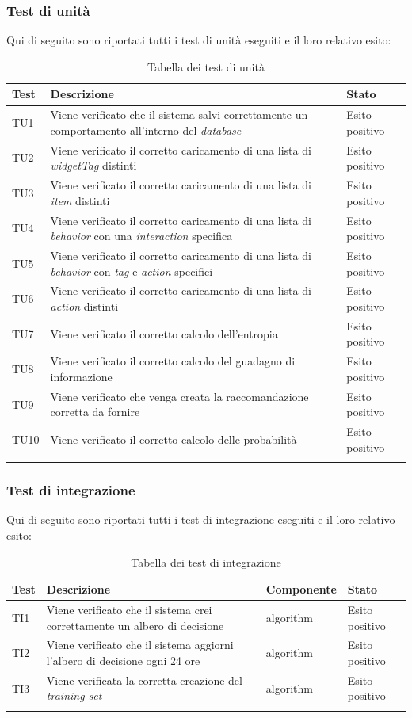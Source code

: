 \subsubsection{Test di unità}
Qui di seguito sono riportati tutti i test di unità eseguiti e il loro relativo esito:
\def\arraystretch{1.8}
\begin{longtable}{|l|p{7cm}|l|}
\hline
\textbf{Test} &	\textbf{Descrizione}	&	\textbf{Stato}	\\\hline
TU1	&	Viene verificato che il sistema salvi correttamente un comportamento all'interno del \emph{database}	&	Esito positivo	\\\hline
TU2	&	Viene verificato il corretto caricamento di una lista di \emph{widgetTag} distinti	&	Esito positivo	\\\hline
TU3	&	Viene verificato il corretto caricamento di una lista di \emph{item} distinti	&	Esito positivo	\\\hline
TU4	&	Viene verificato il corretto caricamento di una lista di \emph{behavior} con una \emph{interaction} specifica	&	Esito positivo	\\\hline
TU5	&	Viene verificato il corretto caricamento di una lista di \emph{behavior} con \emph{tag} e \emph{action} specifici	&	Esito positivo	\\\hline
TU6	&	Viene verificato il corretto caricamento di una lista di \emph{action} distinti	&	Esito positivo	\\\hline
TU7	&	Viene verificato il corretto calcolo dell'entropia	&	Esito positivo	\\\hline
TU8	&	Viene verificato il corretto calcolo del guadagno di informazione	&	Esito positivo	\\\hline
TU9	&	Viene verificato che venga creata la raccomandazione corretta da fornire	&	Esito positivo	\\\hline
TU10	&	Viene verificato il corretto calcolo delle probabilità	&	Esito positivo	\\\hline
\caption{Tabella dei test di unità}
\end{longtable}
\subsubsection{Test di integrazione}
Qui di seguito sono riportati tutti i test di integrazione eseguiti e il loro relativo esito:
\def\arraystretch{1.8}
\begin{longtable}{|l|p{7cm}|l|l|}
\hline
\textbf{Test} &	\textbf{Descrizione}	&	\textbf{Componente}	&	\textbf{Stato}	\\\hline
TI1	&	Viene verificato che il sistema crei correttamente un albero di decisione	&	algorithm	&	Esito positivo	\\\hline
TI2	&	Viene verificato che il sistema aggiorni l'albero di decisione ogni 24 ore	&	algorithm	&	Esito positivo	\\\hline
TI3	&	Viene verificata la corretta creazione del \emph{training set}		&	algorithm	&	Esito positivo	\\\hline
\caption{Tabella dei test di integrazione}
\end{longtable}
